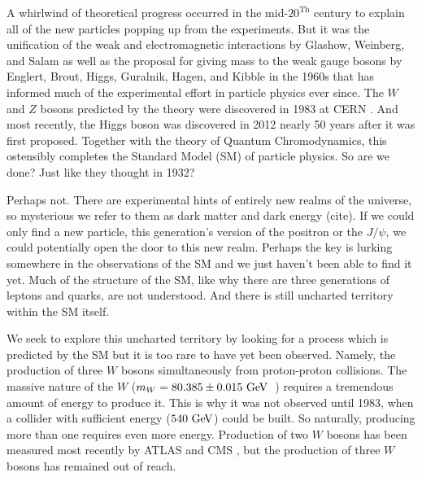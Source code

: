 A whirlwind of theoretical progress occurred in the mid-$20^{\textrm{Th}}$ century
to explain all of the new particles popping up from the experiments. 
But it was the unification of the weak and electromagnetic interactions
by Glashow, Weinberg, and Salam \cite{glashow:1961tr,Salam:1968rm,weinberg:1967tq}
as well as the proposal for giving
mass to the weak gauge bosons by Englert, Brout, Higgs, Guralnik, Hagen,
and Kibble 
\cite{PhysRevLett.13.321,PhysRevLett.13.508,PhysRevLett.13.585}
in the 1960s that has informed much of the 
experimental effort in particle
physics ever since. The $W$ and $Z$ bosons predicted by the theory were 
discovered in 
1983 at CERN \cite{ARNISON1983103,ua1zobs}. 
And most recently, the Higgs boson was 
discovered in 2012 \cite{Aad20121,Chatrchyan:2012xdj}
nearly 50 years after it was first proposed. Together with the 
theory of Quantum Chromodynamics, this ostensibly completes the Standard 
Model (SM) of particle physics. 
So are we done? Just like they thought in 1932?


Perhaps not. There are experimental hints of entirely new realms of the universe, 
so mysterious we refer to them as dark matter and dark energy (cite). 
If we could only find a new particle, this generation's version of the positron
or the $J/\psi$, we could potentially open the door to this new realm.
Perhaps the key is lurking somewhere in the observations of the SM and we 
just haven't been 
able to find it yet.  Much of the structure
of the SM, like why there are three generations of 
leptons and quarks, are not understood.
And there is still uncharted territory within the SM itself.

We seek to explore this uncharted territory by looking for a 
process which is predicted
by the SM but it is too rare to have yet been observed.  Namely, the 
production of 
three $W$ bosons simultaneously from proton-proton collisions. The massive 
nature of the 
$W$ ($m_W = 80.385 \pm 0.015\GeV$~\cite{PDG:2014}) requires a tremendous amount 
of energy 
to produce it. This is why it was not observed until 1983, when a 
collider with sufficient
energy ($540 \GeV$) could be built. So naturally, producing more than one requires
even more energy. Production of two $W$ bosons has been measured most recently 
by ATLAS \cite{Aad:2016wpd} and CMS \cite{Chatrchyan:2013oev}, but 
the production of three $W$ bosons has remained out of reach. 


